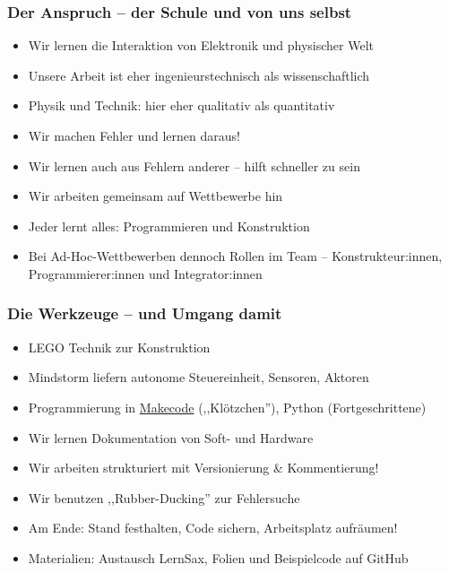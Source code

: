 \documentclass{beamer}
\begin{document}
\begin{frame}
\frametitle{Der Anspruch – der Schule und von uns selbst}
\begin{itemize}
\item  Wir lernen die Interaktion von Elektronik und physischer Welt
\item  Unsere Arbeit ist eher ingenieurstechnisch als wissenschaftlich
\item Physik und Technik: hier eher qualitativ als quantitativ
\item  Wir machen Fehler und lernen daraus!
\item Wir lernen auch aus Fehlern anderer – hilft schneller zu sein
\item  Wir arbeiten gemeinsam auf Wettbewerbe hin
\item  Jeder lernt alles: Programmieren und Konstruktion 
\item  Bei Ad-Hoc-Wettbewerben dennoch Rollen im Team – Konstrukteur:innen, Programmierer:innen und Integrator:innen 
\end{itemize}
\end{frame}

\begin{frame}
\frametitle{Die Werkzeuge – und Umgang damit}
\begin{itemize}
\item  LEGO Technik zur Konstruktion
\item  Mindstorm liefern autonome Steuereinheit, Sensoren, Aktoren
\item Programmierung in \href{https://makecode.mindstorms.com/}{Makecode} (,,Klötzchen''), Python (Fortgeschrittene)
\item  Wir lernen Dokumentation von Soft- und Hardware
\item  Wir arbeiten strukturiert mit Versionierung \& Kommentierung!
\item Wir benutzen ,,Rubber-Ducking'' zur Fehlersuche
\item  Am Ende: Stand festhalten, Code sichern, Arbeitsplatz aufräumen!
\item Materialien: Austausch LernSax, Folien und Beispielcode auf GitHub
\end{itemize}
\end{frame}


\end{document}

